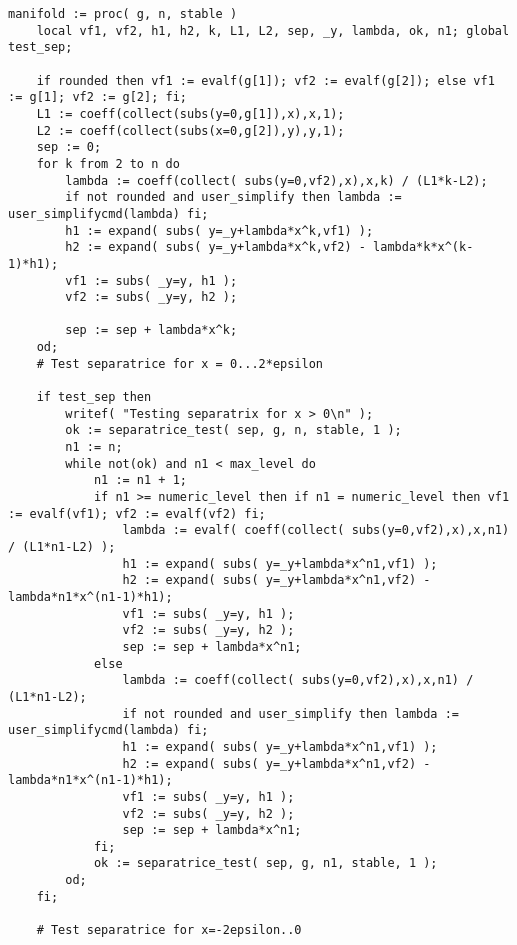 \documentclass[a4paper,10pt]{article}
\begin{document}
\begin{lstlisting}[name=type]
manifold := proc( g, n, stable )
    local vf1, vf2, h1, h2, k, L1, L2, sep, _y, lambda, ok, n1; global test_sep;

    if rounded then vf1 := evalf(g[1]); vf2 := evalf(g[2]); else vf1 := g[1]; vf2 := g[2]; fi;
    L1 := coeff(collect(subs(y=0,g[1]),x),x,1);
    L2 := coeff(collect(subs(x=0,g[2]),y),y,1);
    sep := 0;
    for k from 2 to n do
        lambda := coeff(collect( subs(y=0,vf2),x),x,k) / (L1*k-L2);
        if not rounded and user_simplify then lambda := user_simplifycmd(lambda) fi;
        h1 := expand( subs( y=_y+lambda*x^k,vf1) );
        h2 := expand( subs( y=_y+lambda*x^k,vf2) - lambda*k*x^(k-1)*h1);
        vf1 := subs( _y=y, h1 );
        vf2 := subs( _y=y, h2 );

        sep := sep + lambda*x^k;
    od;
    # Test separatrice for x = 0...2*epsilon

    if test_sep then
        writef( "Testing separatrix for x > 0\n" );
        ok := separatrice_test( sep, g, n, stable, 1 );
        n1 := n;
        while not(ok) and n1 < max_level do
            n1 := n1 + 1;
            if n1 >= numeric_level then if n1 = numeric_level then vf1 := evalf(vf1); vf2 := evalf(vf2) fi;
                lambda := evalf( coeff(collect( subs(y=0,vf2),x),x,n1) / (L1*n1-L2) );
                h1 := expand( subs( y=_y+lambda*x^n1,vf1) );
                h2 := expand( subs( y=_y+lambda*x^n1,vf2) - lambda*n1*x^(n1-1)*h1);
                vf1 := subs( _y=y, h1 );
                vf2 := subs( _y=y, h2 );
                sep := sep + lambda*x^n1;
            else
                lambda := coeff(collect( subs(y=0,vf2),x),x,n1) / (L1*n1-L2);
                if not rounded and user_simplify then lambda := user_simplifycmd(lambda) fi;
                h1 := expand( subs( y=_y+lambda*x^n1,vf1) );
                h2 := expand( subs( y=_y+lambda*x^n1,vf2) - lambda*n1*x^(n1-1)*h1);
                vf1 := subs( _y=y, h1 );
                vf2 := subs( _y=y, h2 );
                sep := sep + lambda*x^n1;
            fi;
            ok := separatrice_test( sep, g, n1, stable, 1 );
        od;
    fi;

    # Test separatrice for x=-2epsilon..0


\end{lstlisting}
\end{document}
